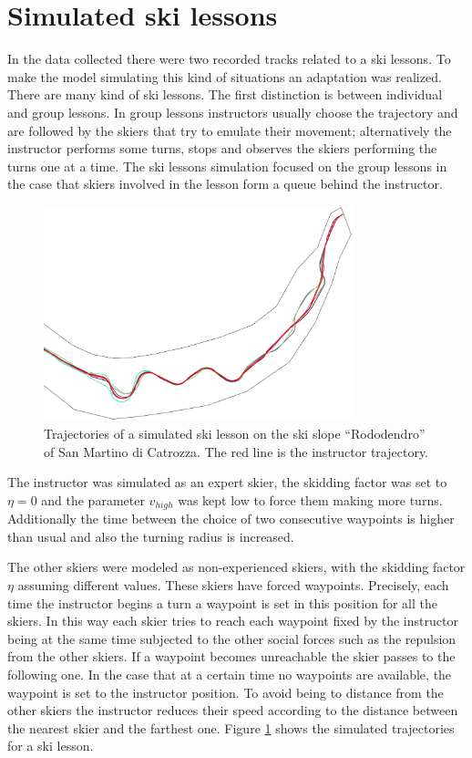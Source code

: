 \documentclass[12pt,a4paper,twoside]{book}
\begin{document}
\section{Simulated ski lessons}\label{ski_lessons}
In the data collected there were two recorded tracks related to a ski lessons. To make the model simulating this kind of situations an adaptation was realized. There are many kind of ski lessons. The first distinction is between individual and group lessons. In group lessons instructors usually choose the trajectory and are followed by the skiers that try to emulate their movement; alternatively the instructor performs some turns, stops and observes the skiers performing the turns one at a time. The ski lessons simulation focused on the group lessons in the case that skiers involved in the lesson form a queue behind the instructor.

\begin{figure}[!b]
  \centering
    \includegraphics[width=0.8\textwidth]{images/lesson.eps}
    \caption{Trajectories of a simulated ski lesson on the ski slope ``Rododendro'' of San Martino di Catrozza. The red line is the instructor trajectory.}\label{lesson}
\end{figure}

The instructor was simulated as an expert skier, the skidding factor was set to $\eta=0$ and the parameter ${v_{high}}$ was kept low to force them making more turns. Additionally the time between the choice of two consecutive waypoints is higher than usual and also the turning radius is increased.

The other skiers were modeled as non-experienced skiers, with the skidding factor $\eta$ assuming different values. These skiers have forced waypoints. Precisely, each time the instructor begins a turn a waypoint is set in this position for all the skiers. In this way each skier tries to reach each waypoint fixed by the instructor being at the same time subjected to the other social forces such as the repulsion from the other skiers. If a waypoint becomes unreachable the skier passes to the following one. In the case that at a certain time no waypoints are available, the waypoint is set to the instructor position. To avoid being to distance from the other skiers the instructor reduces their speed according to the distance between the nearest skier and the farthest one. Figure \ref{lesson} shows the simulated trajectories for a ski lesson.
\end{document}
